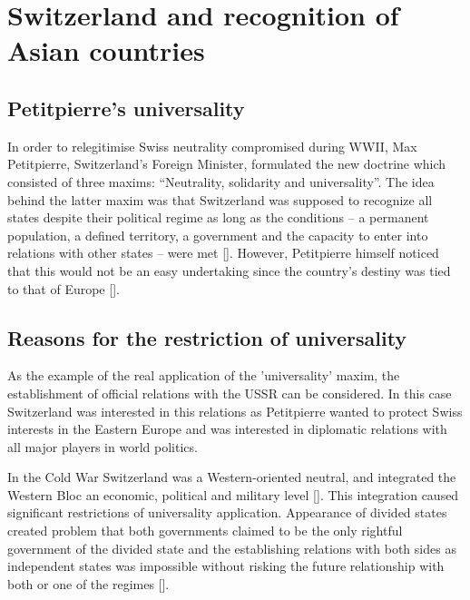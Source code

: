 \documentclass[a4paper]{article}
\begin{document}
\section{Switzerland and recognition of Asian countries}
\subsection{Petitpierre's universality}
In order to relegitimise Swiss neutrality compromised during WWII, Max Petitpierre, Switzerland’s Foreign Minister, formulated the new doctrine which consisted of three maxims: “Neutrality, solidarity and universality”. The idea behind the latter maxim was that Switzerland was supposed to recognize all states despite their political regime as long as the conditions -- a permanent population, a defined territory, a government and the capacity to enter into relations with other states -- were met []. However, Petitpierre himself noticed that this would not be an easy undertaking since the country’s destiny was tied to that of Europe []. 
\subsection{Reasons for the restriction of universality}
As the example of the real application of the 'universality' maxim, the establishment of official relations with the USSR can be considered. In this case Switzerland was interested in this relations as Petitpierre wanted to protect Swiss interests in the Eastern Europe and was interested in diplomatic relations with all major players in world politics.

In the Cold War Switzerland was a Western-oriented neutral, and integrated the Western Bloc an economic, political and military level []. This integration caused significant restrictions of universality application. Appearance of divided states created problem that both governments claimed to be the only rightful government of the divided state and the establishing relations with both sides as independent states was impossible without risking the future relationship with both or one of the regimes [].
\end{document}
